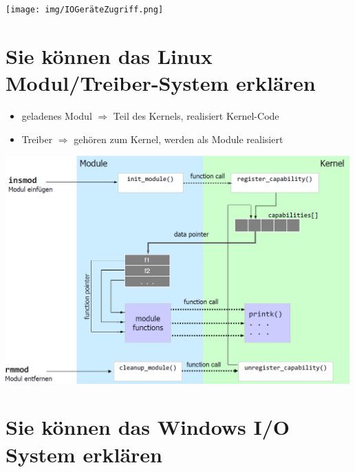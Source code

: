 \documentclass{report}
\newenvironment{Figure}
	{\par\medskip\noindent\minipage{\linewidth}}
	{\endminipage\par\medskip}
\theoremstyle{definition}
\theoremstyle{example}
\begin{document}
\begin{Figure}
\centering
\texttt{[image: img/IOGeräteZugriff.png]}
	\label{fig:Abbildung der Linux Gerätezugriff}
\end{Figure}

\section{Sie können das Linux Modul/Treiber-System erklären}

\begin{itemize}
	\item geladenes Modul $\Rightarrow$ Teil des Kernels, realisiert Kernel-Code
	\item Treiber $\Rightarrow$ gehören zum Kernel, werden als Module realisiert
\end{itemize}

\begin{Figure}
\centering
\includegraphics[width=500px]{img/LinuxTreiberModul.png}
	\label{fig:Abbildung des Treiber vs. Modul in Linux}
\end{Figure}


\section{Sie können das Windows I/O System erklären}
\end{document}
